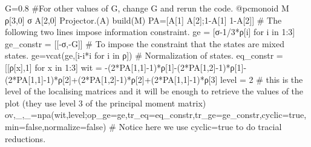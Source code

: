 \begin{code}
    G=0.8  #For other values of G, change G and rerun the code. 
    @pcmonoid M ρ[3,0] σ A[2,0]
    Projector.(A)
    build(M)
    PA=[A[1] A[2];1-A[1] 1-A[2]]
    # The following two lines impose information constraint.
    ge = [σ-1/3*ρ[i] for i in 1:3]
    ge_constr = [[-σ,-G]]
    # To impose the constraint that the states are mixed states.
    ge=vcat(ge,[i-i*i for i in ρ])
    # Normalization of states.
    eq_constr = [[ρ[x],1] for x in 1:3]
    wit = -(2*PA[1,1]-1)*ρ[1]-(2*PA[1,2]-1)*ρ[1]-(2*PA[1,1]-1)*ρ[2]+(2*PA[1,2]-1)*ρ[2]+(2*PA[1,1]-1)*ρ[3]
    level = 2 # this is the level of the localising matrices and it will be enough to retrieve the values of the plot (they use level 3 of the principal moment matrix)
    ov,_,_=npa(wit,level;op_ge=ge,tr_eq=eq_constr,tr_ge=ge_constr,cyclic=true,min=false,normalize=false)
    # Notice here we use cyclic=true to do tracial reductions.
\end{code}
